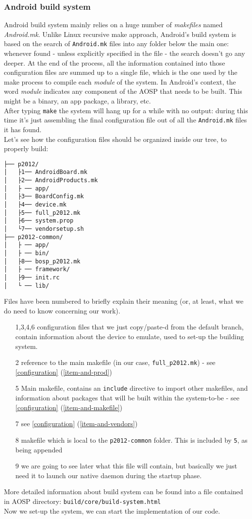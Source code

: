 \subsubsection{Android build system}
\label{build-system}
Android build system mainly relies on a huge number of \textit{makefiles} named \textit{Android.mk}. Unlike Linux recursive make approach, Android's build system is based on the search of \texttt{Android.mk} files into any folder below the main one: whenever found - unless explicitly specified in the file - the search doesn't go any deeper. At the end of the process, all the information contained into those configuration files are summed up to a single file, which is the one used by the make process to compile each \textit{module} of the system. In Android's context, the word \textit{module} indicates any component of the AOSP that needs to be built. This might be a binary, an app package, a library, etc.\\
After typing \texttt{make} the system will hang up for a while with no output: during this time it's just assembling the final configuration file out of all the \texttt{Android.mk} files it has found.\\
Let's see how the configuration files should be organized inside our tree, to properly build:
\begin{verbatim}
├── p2012/
│   ├1── AndroidBoard.mk
│   ├2── AndroidProducts.mk
│   ├ ── app/
│   ├3── BoardConfig.mk
│   ├4── device.mk
│   ├5── full_p2012.mk
│   ├6── system.prop
│   └7── vendorsetup.sh
├── p2012-common/
│   ├ ── app/
│   ├ ── bin/
│   ├8── bosp_p2012.mk
│   ├ ── framework/
│   ├9── init.rc
│   └ ── lib/
\end{verbatim}
Files have been numbered to briefly explain their meaning (or, at least, what we do need to know concerning our work).
\begin{enumerate}
	\item[1,3,4,6] configuration files that we just copy/paste-d from the default branch, contain information about the device to emulate, used to set-up the building system.
	\item[2] reference to the main makefile (in our case, \texttt{full\_p2012.mk}) - see \ref{configuration} (\ref{item-and-prod})
	\item[5] Main makefile, contains an \texttt{include} directive to import other makefiles, and information about packages that will be built within the system-to-be - see \ref{configuration} (\ref{item-and-makefile})
	\item[7] see \ref{configuration} (\ref{item-and-vendors})
	\item[8] makefile which is local to the \texttt{p2012-common} folder. This is included by \texttt{5}, as being appended
	\item[9] we are going to see later what this file will contain, but basically we just need it to launch our native daemon during the startup phase.
\end{enumerate}
More detailed information about build system can be found into a file contained in AOSP directory: \texttt{build/core/build-system.html}\\
Now we set-up the system, we can start the implementation of our code.